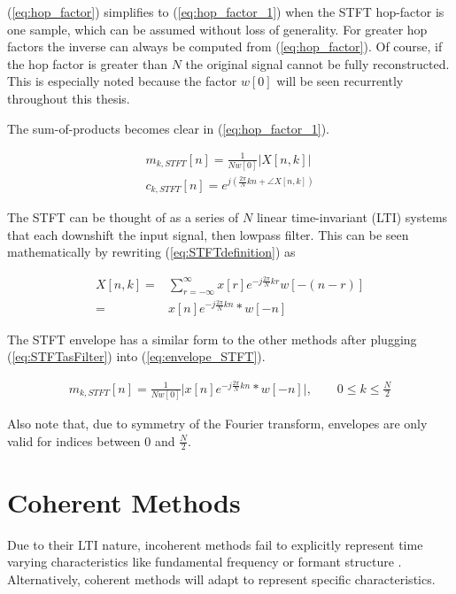 \documentclass [11pt, proquest,oneside] {ganter_thesis}[2015/03/03]
\begin{document}
(\ref{eq:hop_factor}) simplifies to (\ref{eq:hop_factor_1}) when the STFT hop-factor is one sample, which can be assumed without loss of generality.  For greater hop factors the inverse can always be computed from (\ref{eq:hop_factor}).  Of course, if the hop factor is greater than $N$ the original signal cannot be fully reconstructed.  This is especially noted because the factor $w[0]$ will be seen recurrently throughout this thesis.

The sum-of-products becomes clear in (\ref{eq:hop_factor_1}).

\begin{align}
\label{eq:envelope_STFT}
m_{k,STFT}[n] =  \frac{1}{Nw[0]}  \vert X[n,k]\vert \\
c_{k,STFT}[n] = e^{j(\frac{2\pi}{N}kn + \angle X[n,k])}
\end{align}

The STFT can be thought of as a series of $N$ linear time-invariant (LTI) systems that each downshift the input signal, then lowpass filter.  This can be seen mathematically by rewriting (\ref{eq:STFTdefinition}) as

\begin{align}
X[n,k] =& \sum\limits_{r=-\infty}^{\infty} x[r] e^{-j\frac{2\pi}{N}kr} w[-(n - r)] \nonumber \\
\label{eq:STFTasFilter}
=& x[n] e^{-j\frac{2\pi}{N}kn} * w[-n]
\end{align}

The STFT envelope has a similar form to the other methods after plugging (\ref{eq:STFTasFilter}) into (\ref{eq:envelope_STFT}).

\begin{align}
\label{eq:STFT_envelope}
m_{k,STFT}[n] =  \frac{1}{Nw[0]}  \Big\vert x[n] e^{-j\frac{2\pi}{N}kn} * w[-n] \Big\vert, \qquad 0 \leq k \leq \frac{N}{2}
\end{align}

Also note that, due to symmetry of the Fourier transform, envelopes are only valid for indices between $0$ and $\frac{N}{2}$.

\section{Coherent Methods}

Due to their LTI nature, incoherent methods fail to explicitly represent time varying characteristics like fundamental frequency or formant structure \cite{wilson1993design}.  Alternatively, coherent methods will adapt to represent specific characteristics.
\end{document}

